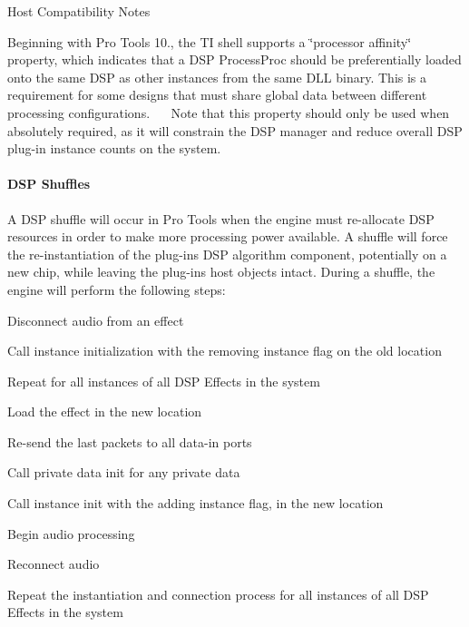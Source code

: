 \begin{DoxyRefDesc}{Host Compatibility Notes}
\item[\hyperlink{a00380__compatibility_notes000022}{Host Compatibility Notes}]Beginning with Pro Tools 10., the T\+I shell supports a \char`\"{}processor affinity\char`\"{} property, which indicates that a D\+S\+P Process\+Proc should be preferentially loaded onto the same D\+S\+P as other instances from the same D\+L\+L binary. This is a requirement for some designs that must share global data between different processing configurations.~\newline
 ~\newline
 Note that this property should only be used when absolutely required, as it will constrain the D\+S\+P manager and reduce overall D\+S\+P plug-\/in instance counts on the system.\end{DoxyRefDesc}


\hypertarget{a00362_subsubsection__dsp_shuffles_}{}\paragraph{D\+S\+P Shuffles}\label{a00362_subsubsection__dsp_shuffles_}
 A D\+S\+P shuffle will occur in Pro Tools when the engine must re-\/allocate D\+S\+P resources in order to make more processing power available. A shuffle will force the re-\/instantiation of the plug-\/in\textquotesingle{}s D\+S\+P algorithm component, potentially on a new chip, while leaving the plug-\/in\textquotesingle{}s host objects intact. During a shuffle, the engine will perform the following steps\+: 
\begin{DoxyEnumerate}
\item Disconnect audio from an effect  
\item Call instance initialization with the removing instance flag on the old location  
\item Repeat for all instances of all D\+S\+P Effects in the system  
\item Load the effect in the new location  
\item Re-\/send the last packets to all data-\/in ports  
\item Call private data init for any private data  
\item Call instance init with the \textquotesingle{}adding instance\textquotesingle{} flag, in the new location  
\item Begin audio processing  
\item Reconnect audio  
\item Repeat the instantiation and connection process for all instances of all D\+S\+P Effects in the system  
\end{DoxyEnumerate}

